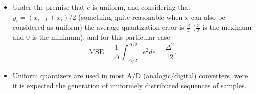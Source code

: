 \begin{itemize}
\item
  Under the premise that $e$ is uniform, and considering that
  $y_i=(x_{i-1}+x_i)/2$ (something quite reasonable when $x$ can also be
  considered as uniform) the average quantization error is
  $\frac{Z}{4}$ ($\frac{Z}{2}$ is the meximum and $0$ is the minimum),
  and for this particular case
  \begin{equation}
    \text{MSE} =
    \frac{1}{\Delta}\int_{-\Delta/2}^{\Delta/2}e^2de=\frac{\Delta^2}{12}.
    \label{eq:MSE_uniform_scalar_quantizer}
  \end{equation}
  
\item
  Uniform quantizers are used in most A/D (analogic/digital)
  converters, were it is expected the generation of uniformely
  distributed sequences of samples.

\end{itemize}

